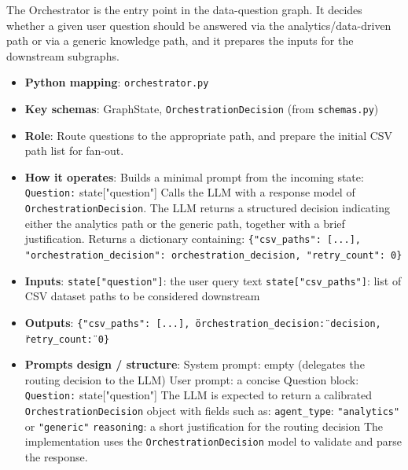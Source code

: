 The Orchestrator is the entry point in the data-question graph. It decides whether a given user question should be answered via the analytics/data-driven path or via a generic knowledge path, and it prepares the inputs for the downstream subgraphs.

\begin{itemize}
  \item \textbf{Python mapping}: \texttt{orchestrator.py}
  \item \textbf{Key schemas}: GraphState, \texttt{OrchestrationDecision} (from \texttt{schemas.py})
  \item \textbf{Role}: Route questions to the appropriate path, and prepare the initial CSV path list for fan-out.
  \item \textbf{How it operates}:
    \subitem Builds a minimal prompt from the incoming state:
    \texttt{Question:} {state["question"]}
    \subitem Calls the LLM with a response model of \texttt{\texttt{OrchestrationDecision}}. The LLM returns a structured decision indicating either the analytics path or the generic path, together with a brief justification.
    \subitem Returns a dictionary containing:
    \texttt{\{"csv\_paths": [...], "orchestration\_decision": orchestration\_decision, "retry\_count": 0\}}
  \item \textbf{Inputs}:
      \subitem \texttt{state["question"]}: the user query text
      \subitem \texttt{state["csv\_paths"]}: list of CSV dataset paths to be considered downstream
    \item \textbf{Outputs}:
      \subitem \texttt{\{"csv\_paths": [...], \"orchestration\_decision\": decision, \"retry\_count\": 0\}}
  \item \textbf{Prompts design / structure}:
      \subitem System prompt: empty (delegates the routing decision to the LLM)
      \subitem User prompt: a concise Question block:
        \texttt{Question:} {state["question"]}
      \subitem The LLM is expected to return a calibrated \texttt{OrchestrationDecision} object with fields such as:
        \texttt{agent\_type}: \texttt{"analytics"} or \texttt{"generic"}
        \texttt{reasoning}: a short justification for the routing decision
      \subitem The implementation uses the \texttt{OrchestrationDecision} model to validate and parse the response.
\end{itemize}
